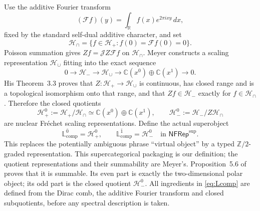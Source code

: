 \documentclass[11pt]{amsart}
\theoremstyle{definition}
\theoremstyle{remark}
\newcommand{\C}{\mathbb C}
\newcommand{\R}{\mathbb R}
\newcommand{\Z}{\mathbb Z}
\begin{document}
Use the additive Fourier transform
\begin{equation}\label{eq:additiveFourier}
 (\mathcal Ff)(y)=\int_\R f(x)e^{2\pi ixy}\,dx,
\end{equation}
fixed by the standard self-dual additive character, and set
\begin{equation}\label{eq:Hcap}
 \mathcal H_\cap=
 \{f\in\mathcal H_+:f(0)=\mathcal Ff(0)=0\}.
\end{equation}
Poisson summation gives $Zf=\mathscr JZ\mathcal Ff$ on
$\mathcal H_\cap$.  Meyer constructs a scaling representation
$\mathcal H_\cup$ fitting into the exact sequence
\begin{equation}\label{eq:poleextension}
 0\longrightarrow\mathcal H_-
 \longrightarrow\mathcal H_\cup
 \longrightarrow\C(x^0)\oplus\C(x^1)\longrightarrow0.
\end{equation}
His Theorem~3.3 proves that
$Z:\mathcal H_+\to\mathcal H_\cup$ is continuous, has closed range and is
a topological isomorphism onto that range, and that
$Zf\in\mathcal H_-$ exactly for $f\in\mathcal H_\cap$.  Therefore the
closed quotients
\begin{equation}\label{eq:Poissonquotients}
 \mathcal H_+^0:=\mathcal H_+/\mathcal H_\cap
 \simeq\C(x^0)\oplus\C(x^1),
 \qquad
 \mathcal H_-^0:=\mathcal H_-/Z\mathcal H_\cap
\end{equation}
are nuclear Fr\'echet scaling representations.  Define the actual
superobject
\begin{equation}\label{eq:Lcomp}
 \mathbb L_{\mathrm{comp}}^{\bar0}=\mathcal H_+^0,\qquad
 \mathbb L_{\mathrm{comp}}^{\bar1}=\mathcal H_-^0
 \quad\text{in }\mathsf{NFRep}^{\mathrm{sup}}.
\end{equation}
This replaces the potentially ambiguous phrase ``virtual object'' by a
typed $\Z/2$-graded representation.  This supercategorical packaging is our
definition; the quotient representations and their summability are
Meyer's.  Proposition~5.6 of
\cite{MeyerZeta} proves that it is summable.  Its even part is exactly the
two-dimensional polar object; its odd part is the closed quotient
$\mathcal H_-^0$.
All ingredients in \eqref{eq:Lcomp} are defined from the Dirac comb, the
additive Fourier transform and closed subquotients, before any spectral
description is taken.
\end{document}

